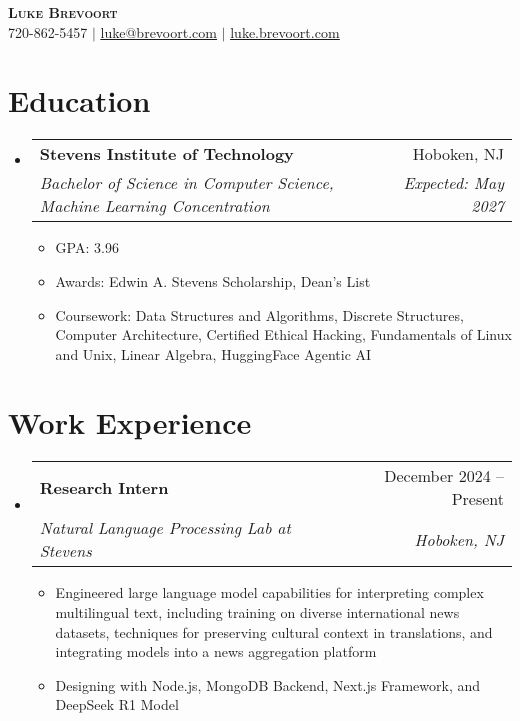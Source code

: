 \documentclass[letterpaper,11pt]{article}
\makeatletter
\newcommand{\resumeItem}[1]{
  \item\small{
    {#1 \vspace{-2pt}}
  }
}
\newcommand{\resumeSubheading}[4]{
  \vspace{-2pt}\item
    \begin{tabular*}{0.97\textwidth}[t]{l@{\extracolsep{\fill}}r}
      \textbf{#1} & #2 \\
      \textit{\small#3} & \textit{\small #4} \\
    \end{tabular*}\vspace{-7pt}
}
\newcommand{\resumeSubHeadingListStart}{\begin{itemize}[leftmargin=0.15in, label={}]}
\newcommand{\resumeSubHeadingListEnd}{\end{itemize}}
\newcommand{\resumeItemListStart}{\begin{itemize}}
\newcommand{\resumeItemListEnd}{\end{itemize}\vspace{-5pt}}
\makeatother
\begin{document}
\begin{center}
    \textbf{\scshape Luke Brevoort} \\ \vspace{1pt}
    \small 720-862-5457 $|$ \href{mailto:luke@brevoort.com}{\underline{luke@brevoort.com}} $|$ 
    \href{https://luke.brevoort.com}{\underline{luke.brevoort.com}}
\end{center}

\section{Education}
  \resumeSubHeadingListStart
    \resumeSubheading
      {Stevens Institute of Technology}{Hoboken, NJ}
      {Bachelor of Science in Computer Science, Machine Learning Concentration}{Expected: May 2027}
      \resumeItemListStart
        \resumeItem{GPA: 3.96}
        \resumeItem{Awards: Edwin A. Stevens Scholarship, Dean's List}
        \resumeItem{Coursework: Data Structures and Algorithms, Discrete Structures, Computer Architecture, Certified Ethical Hacking, Fundamentals of Linux and Unix, Linear Algebra, HuggingFace Agentic AI}
      \resumeItemListEnd
  \resumeSubHeadingListEnd

\section{Work Experience}
  \resumeSubHeadingListStart

    \resumeSubheading
      {Research Intern}{December 2024 -- Present}
      {Natural Language Processing Lab at Stevens}{Hoboken, NJ}
      \resumeItemListStart
        \resumeItem{Engineered large language model capabilities for interpreting complex multilingual text, including training on diverse international news datasets, techniques for preserving cultural context in translations, and integrating models into a news aggregation platform}
        \resumeItem{Designing with Node.js, MongoDB Backend, Next.js Framework, and DeepSeek R1 Model}
      \resumeItemListEnd

  \resumeSubHeadingListEnd

\end{document}
